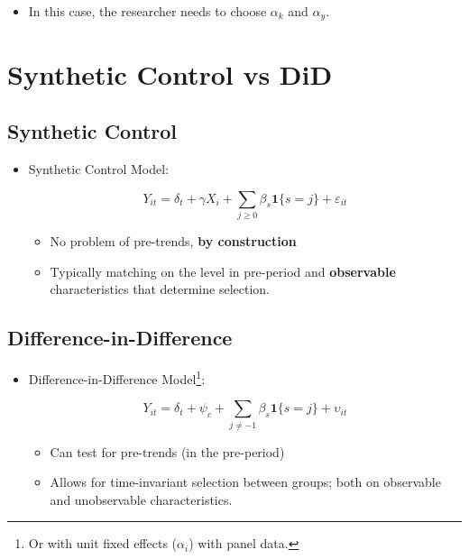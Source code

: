 \documentclass[
  letterpaper,
  DIV=11,
  numbers=noendperiod]{scrreprt}
\providecommand{\tightlist}{%
  \setlength{\itemsep}{0pt}\setlength{\parskip}{0pt}}\usepackage{longtable,booktabs,array}
\theoremstyle{definition}
\theoremstyle{remark}
\begin{document}
\begin{itemize}
\tightlist
\item
  In this case, the researcher needs to choose \(\alpha_{k}\) and
  \(\alpha_{y}\).
\end{itemize}

\section*{Synthetic Control vs DiD}\label{synthetic-control-vs-did}


\subsection*{Synthetic Control}\label{synthetic-control-3}

\begin{itemize}
\item
  Synthetic Control Model:

  \[
  Y_{it} = \delta_t + \gamma X_i + \sum_{j \geq 0} \beta_s \mathbf{1}\{s=j\} + \varepsilon_{it}
  \]

  \begin{itemize}
  \tightlist
  \item
    No problem of pre-trends, \textbf{by construction}
  \item
    Typically matching on the level in pre-period and
    \textbf{observable} characteristics that determine selection.
  \end{itemize}
\end{itemize}

\subsection*{Difference-in-Difference}\label{difference-in-difference}

\begin{itemize}
\item
  Difference-in-Difference Model\footnote{Or with unit fixed effects
    (\(\alpha_i\)) with panel data.}:

  \[
  Y_{it} = \delta_t + \psi_c + \sum_{j \neq -1} \beta_s \mathbf{1}\{s=j\}+\upsilon_{it}
  \]

  \begin{itemize}
  \tightlist
  \item
    Can test for pre-trends (in the pre-period)
  \item
    Allows for time-invariant selection between groups; both on
    observable and unobservable characteristics.
  \end{itemize}
\end{itemize}
\end{document}
